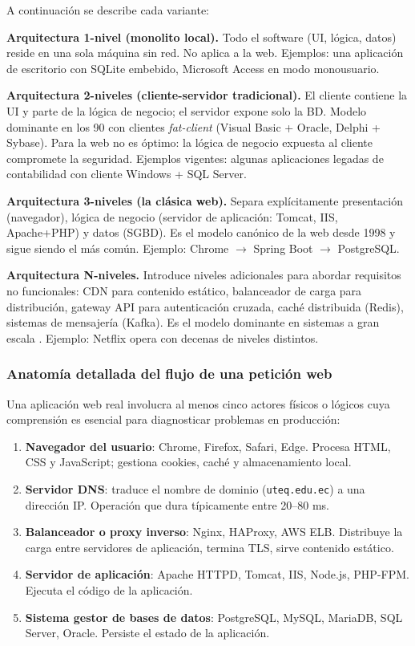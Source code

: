 \documentclass[11pt,a4paper,openany]{book}
\begin{document}
A continuación se describe cada variante:

\textbf{Arquitectura 1-nivel (monolito local).} Todo el software (UI,
lógica, datos) reside en una sola máquina sin red. No aplica a la
web. Ejemplos: una aplicación de escritorio con SQLite embebido,
Microsoft Access en modo monousuario.

\textbf{Arquitectura 2-niveles (cliente-servidor tradicional).} El
cliente contiene la UI y parte de la lógica de negocio; el servidor
expone solo la BD. Modelo dominante en los 90 con clientes
\emph{fat-client} (Visual Basic + Oracle, Delphi + Sybase). Para la
web no es óptimo: la lógica de negocio expuesta al cliente compromete
la seguridad. Ejemplos vigentes: algunas aplicaciones legadas de
contabilidad con cliente Windows + SQL Server.

\textbf{Arquitectura 3-niveles (la clásica web).} Separa
explícitamente presentación (navegador), lógica de negocio (servidor
de aplicación: Tomcat, IIS, Apache+PHP) y datos (SGBD). Es el modelo
canónico de la web desde 1998 y sigue siendo el más común. Ejemplo:
Chrome $\to$ Spring Boot $\to$ PostgreSQL.

\textbf{Arquitectura N-niveles.} Introduce niveles adicionales para
abordar requisitos no funcionales: CDN para contenido estático,
balanceador de carga para distribución, gateway API para
autenticación cruzada, caché distribuida (Redis), sistemas de
mensajería (Kafka). Es el modelo dominante en sistemas a gran escala
\cite{bass2021software,kleppmann2017designing}. Ejemplo: Netflix
opera con decenas de niveles distintos.

\subsubsection{Anatomía detallada del flujo de una petición web}

Una aplicación web real involucra al menos cinco actores físicos o
lógicos cuya comprensión es esencial para diagnosticar problemas en
producción:

\begin{enumerate}
\item \textbf{Navegador del usuario}: Chrome, Firefox, Safari, Edge.
Procesa HTML, CSS y JavaScript; gestiona cookies, caché y
almacenamiento local.
\item \textbf{Servidor DNS}: traduce el nombre de dominio
(\texttt{uteq.edu.ec}) a una dirección IP. Operación que dura
típicamente entre 20--80 ms.
\item \textbf{Balanceador o proxy inverso}: Nginx, HAProxy, AWS ELB.
Distribuye la carga entre servidores de aplicación, termina TLS,
sirve contenido estático.
\item \textbf{Servidor de aplicación}: Apache HTTPD, Tomcat, IIS,
Node.js, PHP-FPM. Ejecuta el código de la aplicación.
\item \textbf{Sistema gestor de bases de datos}: PostgreSQL, MySQL,
MariaDB, SQL Server, Oracle. Persiste el estado de la aplicación.
\end{enumerate}
\end{document}
